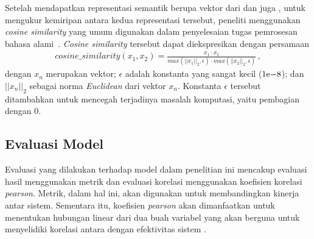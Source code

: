 Setelah mendapatkan representasi semantik berupa vektor dari \bert{} dan juga \tfive{}, untuk mengukur kemiripan antara kedua representasi tersebut, peneliti menggunakan \textit{cosine similarity} yang umum digunakan dalam penyelesaian tugas pemrosesan bahasa alami~\citep{wehnert2021legal,zhou2022problems}. \textit{Cosine similarity} tersebut dapat diekspresikan dengan persamaan
\begin{align*}
    cosine\_similarity(x_1,x_2)=\frac{x_1\cdot{}x_2}{max(||x_1||_2,\epsilon{})\cdot{}max(||x_2||_2,\epsilon{})} \, ,
\end{align*}
dengan \(x_n\) merupakan vektor; \(\epsilon{}\) adalah konstanta yang sangat kecil (\({1}\mathrm{e}{-8}\)); dan \(||x_n||_2\) sebagai norma \textit{Euclidean} dari vektor \(x_n\). Konstanta \(\epsilon{}\) tersebut ditambahkan untuk mencegah terjadinya masalah komputasi, yaitu pembagian dengan 0.

\subsection{Evaluasi Model}
\label{subbab:3:Evaluasi Model}
Evaluasi yang dilakukan terhadap model dalam penelitian ini mencakup evaluasi hasil menggunakan metrik dan evaluasi korelasi menggunakan koefisien korelasi \textit{pearson}. Metrik, dalam hal ini, akan digunakan untuk membandingkan kinerja antar sistem. Sementara itu, koefisien \textit{pearson} akan dimanfaatkan untuk menentukan hubungan linear dari dua buah variabel yang akan berguna untuk menyelidiki korelasi antara \cutoff{} dengan efektivitas sistem \ir{}.

